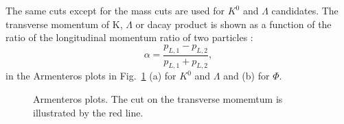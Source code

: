 The same cuts except for the mass cuts are used for $K^0$ and $\Lambda$ candidates. The transverse momentum of K, $\Lambda$ or dacay product is shown as a function of the ratio of the longitudinal momentum ratio of two particles :
%
\begin{equation}
  \alpha = \frac{p_{L,1}-p_{L,2}}{p_{L,1}+p_{L,2}},
\end{equation}
%
in the Armenteros plots in Fig.~\ref{pic:Armenteros} (a) for $K^0$ and $\Lambda$ and (b) for $\Phi$.

\begin{figure}[!h]
  \centering
	\caption{Armenteros plots. The cut on the transverse momemtum is illustrated by the red line.}
	\label{pic:Armenteros}
\end{figure}

